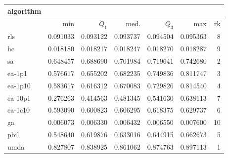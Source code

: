 \begin{tabular}{@{}l*{5}{>{{}}N{1}{3}}>{{}}N{2}{0}@{}}
\toprule
{algorithm} &  \\
\midrule
& {min} & {$Q_1$} & {med.} & {$Q_3$} & {max} & {rk}\\
\midrule
rls & 0.091033 & 0.093122 & 0.093737 & 0.094504 & 0.095363 & 8\\
hc & 0.018180 & 0.018217 & 0.018247 & 0.018270 & 0.018287 & 9\\
sa & 0.648457 & 0.688690 & 0.701984 & 0.719641 & 0.742680 & 2\\
ea-1p1 & 0.576617 & 0.655202 & 0.682235 & 0.749836 & 0.811747 & 3\\
ea-1p10 & 0.583617 & 0.616312 & 0.670083 & 0.729826 & 0.814540 & 4\\
ea-10p1 & 0.276263 & 0.414563 & 0.481345 & 0.541630 & 0.638113 & 7\\
ea-1c10 & 0.593090 & 0.600823 & 0.606295 & 0.618375 & 0.629737 & 6\\
ga & 0.006073 & 0.006330 & 0.006432 & 0.006550 & 0.007600 & 10\\
pbil & 0.548640 & 0.619876 & 0.633016 & 0.644915 & 0.662673 & 5\\
umda & {\color{blue}} 0.827807 & {\color{blue}} 0.838925 & {\color{blue}} 0.861062 & {\color{blue}} 0.874763 & {\color{blue}} 0.897113 & 1\\
\bottomrule
\end{tabular}
